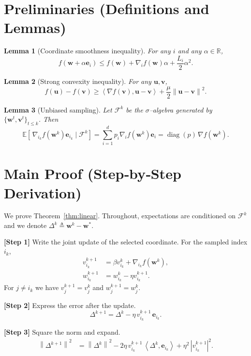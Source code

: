 \documentclass{article}
\newtheorem{lemma}{Lemma}
\newcommand{\E}{\mathbb{E}}
\newcommand{\R}{\mathbb{R}}
\newcommand{\norm}[1]{\left\|#1\right\|}
\newcommand{\ip}[2]{\left\langle #1,#2\right\rangle}
\begin{document}
\section*{Preliminaries (Definitions and Lemmas)}
\begin{lemma}[Coordinate smoothness inequality]\label{lem:smooth}
For any $i$ and any $\alpha\in\R$,
\[
    f(\mathbf w+\alpha\mathbf e_i)\le f(\mathbf w)+\nabla_i f(\mathbf w)\alpha+\frac{L_i}{2}\alpha^{2}.
\]
\end{lemma}
\begin{lemma}[Strong convexity inequality]\label{lem:strong}
For any $\mathbf u,\mathbf v$,
\[
    f(\mathbf u)-f(\mathbf v)\ge\ip{\nabla f(\mathbf v)}{\mathbf u-\mathbf v}
    +\frac{\mu}{2}\norm{\mathbf u-\mathbf v}^{2}.
\]
\end{lemma}
\begin{lemma}[Unbiased sampling]\label{lem:unbiased}
Let $\mathcal F^{k}$ be the $\sigma$–algebra generated by $\{\mathbf w^{t},\mathbf v^{t}\}_{t\le k}$. Then
\[
    \E\!\left[\,\nabla_{i_k} f(\mathbf w^{k})\mathbf e_{i_k}\mid\mathcal F^{k}\right]
    =\sum_{i=1}^{d}p_i\nabla_i f(\mathbf w^{k})\mathbf e_i
    =\operatorname{diag}(p)\,\nabla f(\mathbf w^{k}).
\]
\end{lemma}

\section*{Main Proof (Step‑by‑Step Derivation)}
We prove Theorem~\ref{thm:linear}.  Throughout, expectations are conditioned on $\mathcal F^{k}$ and we denote $\Delta^{k}\triangleq\mathbf w^{k}-\mathbf w^{*}$.

\medskip
\noindent\textbf{[Step 1]} Write the joint update of the selected coordinate.
For the sampled index $i_k$,
\[
\begin{aligned}
    v^{k+1}_{i_k} &= \beta v^{k}_{i_k}+ \nabla_{i_k} f(\mathbf w^{k}),\\
    w^{k+1}_{i_k} &= w^{k}_{i_k}-\eta v^{k+1}_{i_k}.
\end{aligned}
\tag{1}
\]
For $j\neq i_k$ we have $v^{k+1}_{j}=v^{k}_{j}$ and $w^{k+1}_{j}=w^{k}_{j}$.

\medskip
\noindent\textbf{[Step 2]} Express the error after the update.
\[
\Delta^{k+1}= \Delta^{k}
    -\eta\,v^{k+1}_{i_k}\,\mathbf e_{i_k}.
\tag{2}
\]

\medskip
\noindent\textbf{[Step 3]} Square the norm and expand.
\[
\begin{aligned}
    \norm{\Delta^{k+1}}^{2}
    &=\norm{\Delta^{k}}^{2}
      -2\eta\,v^{k+1}_{i_k}\,\ip{\Delta^{k}}{\mathbf e_{i_k}}
      +\eta^{2}\,|v^{k+1}_{i_k}|^{2}.
\end{aligned}
\tag{3}
\]
\end{document}
